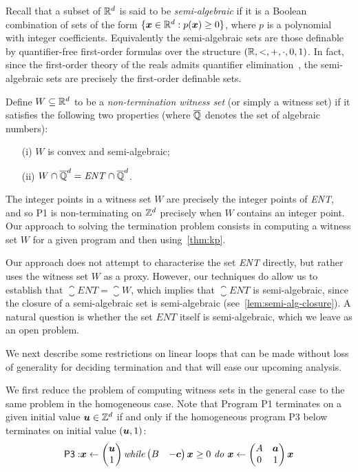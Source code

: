 Recall that a subset of $\mathbb{R}^{d}$ is said to be
\emph{semi-algebraic} if it is a Boolean combination of sets of the
form $\{ \boldsymbol{x} \in \mathbb{R}^{d} : p(\boldsymbol{x})\geq 0\}$,
where $p$ is a polynomial with integer coefficients.  Equivalently the
semi-algebraic sets are those definable by quantifier-free first-order
formulas over the structure $(\mathbb{R},<,+,\cdot,0,1)$.  In fact,
since the first-order theory of the reals admits quantifier
elimination~\cite{Tar51}, the semi-algebraic sets are precisely the
first-order definable sets.

Define $W \subseteq \mathbb{R}^{d}$ to be a
\emph{non-termination witness set} (or simply a witness set) if it
satisfies the following two properties (where $\overline{\mathbb{Q}}$ denotes the
set of algebraic numbers):
\begin{itemize}
\item[(i)] $W$ is convex and semi-algebraic;
\item[(ii)] $W\cap \overline{\mathbb{Q}}^{d}=\mathit{ENT}\cap \overline{\mathbb{Q}}^{d}$.
\end{itemize}

The integer points in a witness set $W$ are precisely the integer
points of \textit{ENT}, and so \textsf{P1} is non-terminating on
$\mathbb{Z}^{d}$ precisely when $W$ contains an integer point.  Our
approach to solving the termination problem consists in computing a
witness set $W$ for a given program and then using~\cref{thm:kp}.

Our approach does not attempt to characterise the set \textit{ENT}
directly, but rather uses the witness set $W$ as a proxy. However, our
techniques do allow us to establish that
$\closure{\mathit{ENT}}=\closure{W}$, which implies
that $\closure{\mathit{ENT}}$ is semi-algebraic, since the closure of
a semi-algebraic set is semi-algebraic (see~\cref{lem:semi-alg-closure}). A natural question is whether the set $ENT$
itself is semi-algebraic, which we leave as an open problem.

We next describe some restrictions on linear loops that can
be made without loss of generality for deciding termination
and that will ease our upcoming analysis.

We first reduce the problem of computing witness sets in the general
case to the same problem in the homogeneous case.  Note that Program
\textsf{P1} terminates on a given initial value $\boldsymbol{u}\in
\mathbb{Z}^{d}$ if and only if the homogeneous program \textsf{P3} below
terminates on initial value $(\boldsymbol{u}, 1)$:
\begin{align*}
\mathsf{P3:} \boldsymbol{x}\gets
\begin{pmatrix} \boldsymbol{u}\\ 1\end{pmatrix} \mbox{\textit{while}} \begin{pmatrix}B &-\boldsymbol{c} \end{pmatrix}
\boldsymbol{x} \geq 0 \mbox{ \textit{do} } \boldsymbol{x}\leftarrow
\begin{pmatrix}A&\boldsymbol{a}\\ 0 & 1
\end{pmatrix} \boldsymbol{x}
\end{align*}

